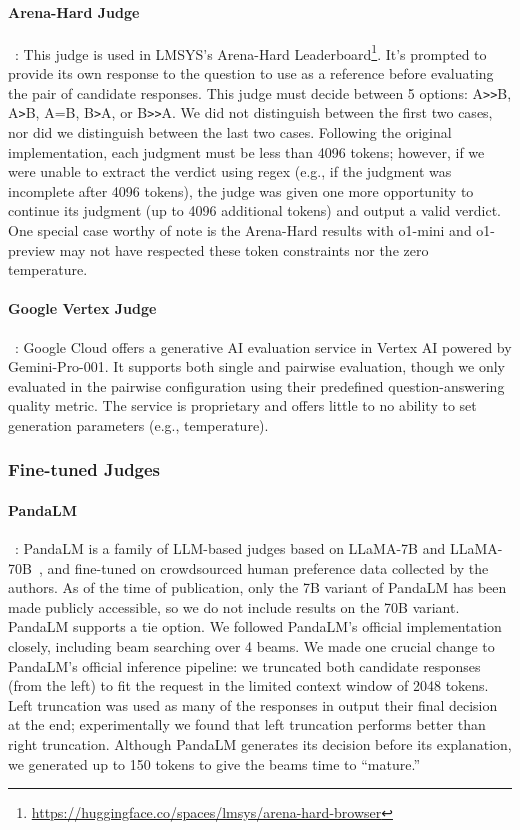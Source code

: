 \documentclass{article} %
\begin{document}
\paragraph{Arena-Hard Judge}~\citep{li2024arenahard}: This judge is used in LMSYS's Arena-Hard Leaderboard\footnote{\url{https://huggingface.co/spaces/lmsys/arena-hard-browser}}. It's prompted to provide its own response to the question to use as a reference before evaluating the pair of candidate responses. This judge must decide between 5 options: A\texttt{>>}B, A\texttt{>}B, A=B, B\texttt{>}A, or B\texttt{>>}A. We did not distinguish between the first two cases, nor did we distinguish between the last two cases. Following the original implementation, each judgment must be less than 4096 tokens; however, if we were unable to extract the verdict using regex (e.g., if the judgment was incomplete after 4096 tokens), the judge was given one more opportunity to continue its judgment (up to 4096 additional tokens) and output a valid verdict. One special case worthy of note is the Arena-Hard results with o1-mini and o1-preview may not have respected these token constraints nor the zero temperature.
\paragraph{Google Vertex Judge}~\citep{vertexjudge2024}: Google Cloud offers a generative AI evaluation service in Vertex AI powered by Gemini-Pro-001. It supports both single and pairwise evaluation, though we only evaluated in the pairwise configuration using their predefined question-answering quality metric. The service is proprietary and offers little to no ability to set generation parameters (e.g., temperature).

\subsubsection{Fine-tuned Judges}
\paragraph{PandaLM}~\citep{wang2023pandalm}: PandaLM is a family of LLM-based judges based on LLaMA-7B and LLaMA-70B~\citep{touvron2023llama}, and fine-tuned on crowdsourced human preference data collected by the authors. As of the time of publication, only the 7B variant of PandaLM has been made publicly accessible, so we do not include results on the 70B variant. PandaLM supports a tie option. We followed PandaLM's official implementation closely, including beam searching over 4 beams. We made one crucial change to PandaLM's official inference pipeline: we truncated both candidate responses (from the left) to fit the request in the limited context window of 2048 tokens. Left truncation was used as many of the responses in \sys output their final decision at the end; experimentally we found that left truncation performs better than right truncation. Although PandaLM generates its decision before its explanation, we generated up to 150 tokens to give the beams time to ``mature.''
\end{document}
